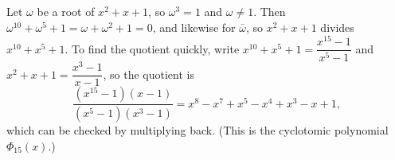 Let $\omega$ be a root of $x^2+x+1$, so $\omega^3=1$ and $\omega\ne1$. Then $\omega^{10}+\omega^5+1=\omega+\omega^2+1=0$, and likewise for $\bar\omega$, so $x^2+x+1$ divides $x^{10}+x^5+1$. To find the quotient quickly, write $x^{10}+x^5+1=\dfrac{x^{15}-1}{x^5-1}$ and $x^2+x+1=\dfrac{x^3-1}{x-1}$, so the quotient is
\[
\dfrac{(x^{15}-1)(x-1)}{(x^5-1)(x^3-1)}=\boxed{x^8-x^7+x^5-x^4+x^3-x+1},
\]
which can be checked by multiplying back. (This is the cyclotomic polynomial $\Phi_{15}(x)$.)
